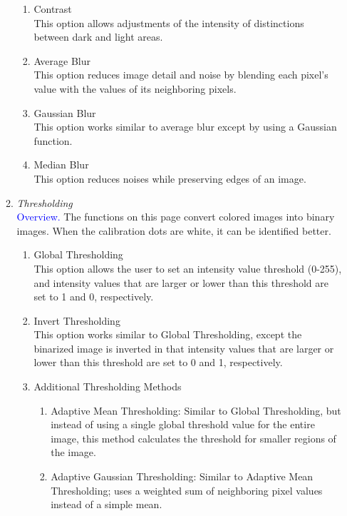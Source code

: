 \documentclass[a4paper,fleqn]{article}
\begin{document}
\begin{enumerate}
\begin{enumerate}
\begin{enumerate}
         \item Contrast\\
         This option allows adjustments of the intensity of distinctions between dark and light areas.

         \item Average Blur\\
         This option reduces image detail and noise by blending each pixel's value with the values of its neighboring pixels.

         \item Gaussian Blur\\
         This option works similar to average blur except by using a Gaussian function.

         \item Median Blur\\
         This option reduces noises while preserving edges of an image.\\
    \end{enumerate}
    
    \item \textit{Thresholding}\\
    \textcolor{blue}{Overview.} The functions on this page convert colored images into binary images. When the calibration dots are white, it can be identified better.
    \begin{enumerate}
        \item Global Thresholding\\
        This option allows the user to set an intensity value threshold (0-255), and intensity values that are larger or lower than this threshold are set to 1 and 0, respectively. 

        \item Invert Thresholding\\
        This option works similar to Global Thresholding, except the binarized image is inverted in that  intensity values that are larger or lower than this threshold are set to 0 and 1, respectively.

        \item Additional Thresholding Methods
        \begin{enumerate}
            \item Adaptive Mean Thresholding: Similar to Global Thresholding, but instead of using a single global threshold value for the entire image, this method calculates the threshold for smaller regions of the image. 

            \item Adaptive Gaussian Thresholding: Similar to Adaptive Mean Thresholding; uses a weighted sum of neighboring pixel values instead of a simple mean.


\end{enumerate}
\end{enumerate}
\end{enumerate}
\end{enumerate}
\end{document}
